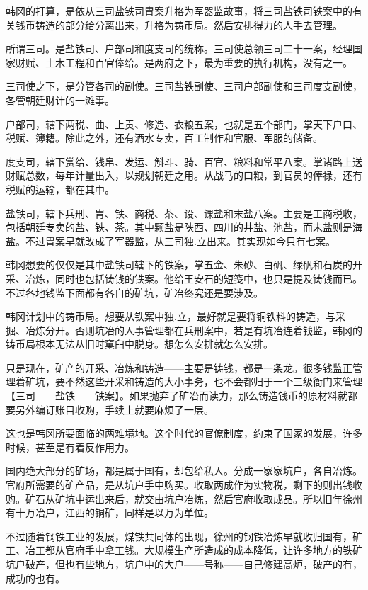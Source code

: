 韩冈的打算，是依从三司盐铁司胄案升格为军器监故事，将三司盐铁司铁案中的有关钱币铸造的部分给分离出来，升格为铸币局。然后安排得力的人手去管理。

所谓三司。是盐铁司、户部司和度支司的统称。三司使总领三司二十一案，经理国家财赋、土木工程和百官俸给。是两府之下，最为重要的执行机构，没有之一。

三司使之下，是分管各司的副使。三司盐铁副使、三司户部副使和三司度支副使，各管朝廷财计的一滩事。

户部司，辖下两税、曲、上贡、修造、衣粮五案，也就是五个部门，掌天下户口、税赋、簿籍。除此之外，还有酒水专卖，百工制作和官服、军服的储备。

度支司，辖下赏给、钱帛、发运、斛斗、骑、百官、粮料和常平八案。掌诸路上送财赋总数，每年计量出入，以规划朝廷之用。从战马的口粮，到官员的俸禄，还有税赋的运输，都在其中。

盐铁司，辖下兵刑、胄、铁、商税、茶、设、课盐和末盐八案。主要是工商税收，包括朝廷专卖的盐、铁、茶。其中颗盐是陕西、四川的井盐、池盐，而末盐则是海盐。不过胄案早就改成了军器监，从三司独.立出来。其实现如今只有七案。

韩冈想要的仅仅是其中盐铁司辖下的铁案，掌五金、朱砂、白矾、绿矾和石炭的开采、冶炼，同时也包括铸钱的铁案。他给王安石的短笺中，也只是提及铸钱而已。不过各地钱监下面都有各自的矿坑，矿冶终究还是要涉及。

韩冈计划中的铸币局。想要从铁案中独.立，最好就是要将铜铁料的铸造，与采掘、冶炼分开。否则坑冶的人事管理都在兵刑案中，若是有坑冶连着钱监，韩冈的铸币局根本无法从旧时窠臼中脱身。想怎么安排就怎么安排。

只是现在，矿产的开采、冶炼和铸造——主要是铸钱，都是一条龙。很多钱监正管理着矿坑，要不然这些开采和铸造的大小事务，也不会都归于一个三级衙门来管理【三司——盐铁——铁案】。如果抛弃了矿冶而读力，那么铸造钱币的原材料就都要另外编订账目收购，手续上就要麻烦了一层。

这也是韩冈所要面临的两难境地。这个时代的官僚制度，约束了国家的发展，许多时候，甚至是有着反作用力。

国内绝大部分的矿场，都是属于国有，却包给私人。分成一家家坑户，各自冶炼。官府所需要的矿产品，是从坑户手中购买。收取两成作为实物税，剩下的则出钱收购。矿石从矿坑中运出来后，就交由坑户冶炼，然后官府收取成品。所以旧年徐州有十万冶户，江西的铜矿，同样是以万为单位。

不过随着钢铁工业的发展，煤铁共同体的出现，徐州的钢铁冶炼早就收归国有，矿工、冶工都从官府手中拿工钱。大规模生产所造成的成本降低，让许多地方的铁矿坑户破产，但也有些地方，坑户中的大户——号称——自己修建高炉，破产的有，成功的也有。

